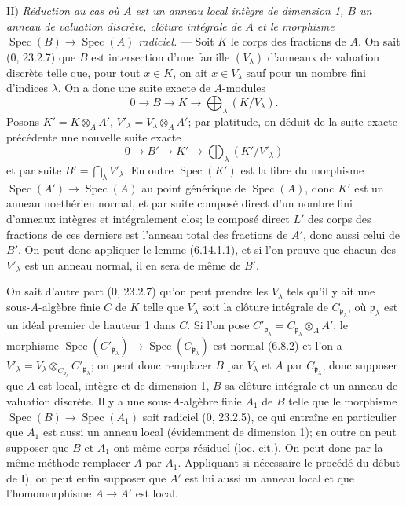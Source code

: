 \documentclass[10pt,oneside]{book}
\newcommand{\oldpage}[2][]{%
  \setcounter{footnote}{0}%
  \marginpar{\scriptsize\textbf{#1}~|~#2}\ignorespaces}
\begin{document}
\oldpage[IV-2]{171}
II) \emph{Réduction au cas où $A$ est un anneau local intègre de dimension
1, $B$ un anneau de valuation discrète, clôture intégrale de $A$ et le
morphisme $\operatorname{Spec}(B)\to\operatorname{Spec}(A)$ radiciel.} ---
Soit $K$ le corps des fractions de $A$. On sait (0, 23.2.7) que $B$ est
intersection d'une famille $(V_\lambda)$ d'anneaux de valuation discrète
telle que, pour tout $x\in K$, on ait $x\in V_\lambda$ sauf pour un nombre
fini d'indices $\lambda$. On a donc une suite exacte de $A$-modules
\[
0\longrightarrow B\longrightarrow K\longrightarrow
\bigoplus_\lambda(K/V_\lambda).
\]
Posons $K'=K\otimes_A A'$, $V'_\lambda=V_\lambda\otimes_A A'$; par
platitude, on déduit de la suite exacte précédente une nouvelle suite
exacte
\[
0\longrightarrow B'\longrightarrow K'\longrightarrow
\bigoplus_\lambda(K'/V'_\lambda)
\]
et par suite $B'=\bigcap_\lambda V'_\lambda$. En outre
$\operatorname{Spec}(K')$ est la fibre du morphisme
$\operatorname{Spec}(A')\to\operatorname{Spec}(A)$ au point générique de
$\operatorname{Spec}(A)$, donc $K'$ est un anneau noethérien normal, et par
suite composé direct d'un nombre fini d'anneaux intègres et intégralement
clos; le composé direct $L'$ des corps des fractions de ces derniers est
l'anneau total des fractions de $A'$, donc aussi celui de $B'$. On peut donc
appliquer le lemme (6.14.1.1), et si l'on prouve que chacun des
$V'_\lambda$ est un anneau normal, il en sera de même de $B'$.

On sait d'autre part (0, 23.2.7) qu'on peut prendre les $V_\lambda$ tels
qu'il y ait une sous-$A$-algèbre finie $C$ de $K$ telle que $V_\lambda$
soit la clôture intégrale de $C_{\mathfrak p_\lambda}$, où
$\mathfrak p_\lambda$ est un idéal premier de hauteur 1 dans $C$. Si l'on
pose $C'_{\mathfrak p_\lambda}=C_{\mathfrak p_\lambda}\otimes_A A'$, le
morphisme $\operatorname{Spec}(C'_{\mathfrak p_\lambda})\to
\operatorname{Spec}(C_{\mathfrak p_\lambda})$ est normal (6.8.2) et l'on a
$V'_\lambda=V_\lambda\otimes_{C_{\mathfrak p_\lambda}}
C'_{\mathfrak p_\lambda}$; on peut donc remplacer $B$ par $V_\lambda$ et
$A$ par $C_{\mathfrak p_\lambda}$, donc supposer que $A$ est local, intègre
et de dimension 1, $B$ sa clôture intégrale et un anneau de valuation
discrète. Il y a une sous-$A$-algèbre finie $A_1$ de $B$ telle que le
morphisme $\operatorname{Spec}(B)\to\operatorname{Spec}(A_1)$ soit radiciel
(0, 23.2.5), ce qui entraîne en particulier que $A_1$ est aussi un anneau
local (évidemment de dimension 1); en outre on peut supposer que $B$ et
$A_1$ ont même corps résiduel (loc. cit.). On peut donc par la même méthode
remplacer $A$ par $A_1$. Appliquant si nécessaire le procédé du début de
I), on peut enfin supposer que $A'$ est lui aussi un anneau local et que
l'homomorphisme $A\to A'$ est local.
\end{document}
